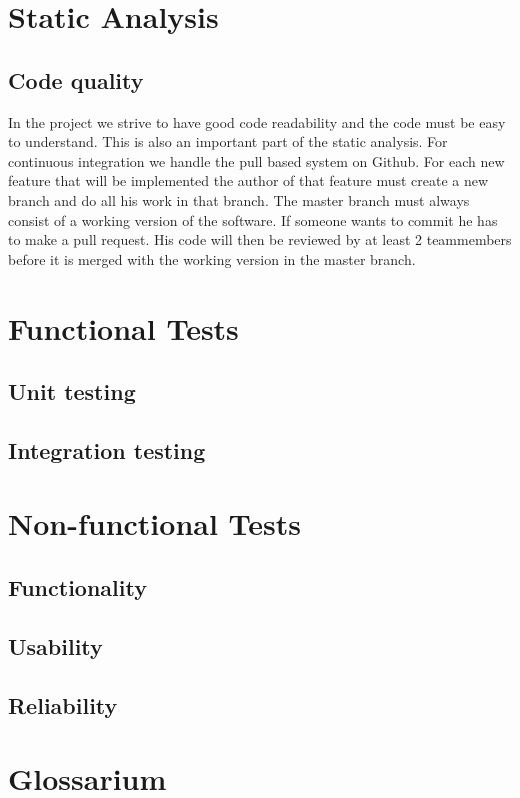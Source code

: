\documentclass[a4paper]{article}
\begin{document}
\section{Static Analysis}

\subsection{Code quality}
In the project we strive to have good code readability and the code must be easy
to understand. This is also an important part of the static analysis. For
continuous integration we handle the pull based system on Github. For each new
feature that will be implemented the author of that feature must create a new
branch and do all his work in that branch. The master branch must always consist
of a working version of the software. If someone wants to commit he has to
make a pull request. His code will then be reviewed by at least 2
teammembers before it is merged with the working version in the master branch.

\section{Functional Tests}

\subsection{Unit testing}

\subsection{Integration testing}


\section{Non-functional Tests}

\subsection{Functionality}

\subsection{Usability}

\subsection{Reliability}


\section{Glossarium}
\end{document}
